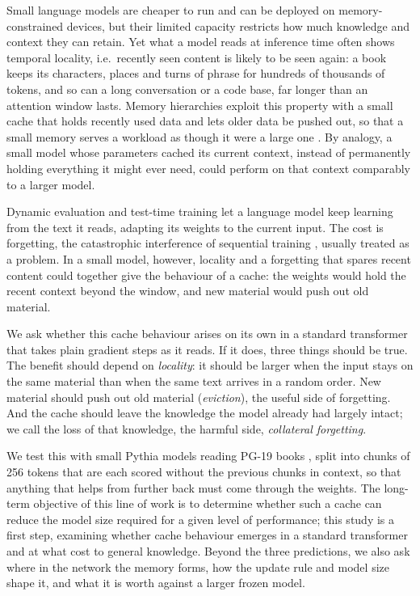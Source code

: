 \documentclass[times,twocolumn,final,authoryear]{elsarticle}
\begin{document}
Small language models are cheaper to run and can be deployed on memory-constrained devices, but their limited capacity restricts how much knowledge and context they can retain.
Yet what a model reads at inference time often shows temporal locality, i.e.\ recently seen content is likely to be seen again: a book keeps its characters, places and turns of phrase for hundreds of thousands of tokens, and so can a long conversation or a code base, far longer than an attention window lasts.
Memory hierarchies exploit this property with a small cache that holds recently used data and lets older data be pushed out, so that a small memory serves a workload as though it were a large one \citep{denning1968working}.
By analogy, a small model whose parameters cached its current context, instead of permanently holding everything it might ever need, could perform on that context comparably to a larger model.

Dynamic evaluation \citep{krause2018dynamic,krause2019dynamic,rannentriki2024revisiting} and test-time training \citep{feng2026inplace,bansal2026lets,tandon2025endtoend} let a language model keep learning from the text it reads, adapting its weights to the current input.
The cost is forgetting, the catastrophic interference of sequential training \citep{mccloskey1989catastrophic}, usually treated as a problem.
In a small model, however, locality and a forgetting that spares recent content could together give the behaviour of a cache: the weights would hold the recent context beyond the window, and new material would push out old material.

We ask whether this cache behaviour arises on its own in a standard transformer that takes plain gradient steps as it reads.
If it does, three things should be true.
The benefit should depend on \emph{locality}: it should be larger when the input stays on the same material than when the same text arrives in a random order.
New material should push out old material (\emph{eviction}), the useful side of forgetting.
And the cache should leave the knowledge the model already had largely intact; we call the loss of that knowledge, the harmful side, \emph{collateral forgetting}.

We test this with small Pythia models \citep{biderman2023pythia} reading PG-19 books \citep{rae2020compressive}, split into chunks of 256 tokens that are each scored without the previous chunks in context, so that anything that helps from further back must come through the weights.
The long-term objective of this line of work is to determine whether such a cache can reduce the model size required for a given level of performance; this study is a first step, examining whether cache behaviour emerges in a standard transformer and at what cost to general knowledge.
Beyond the three predictions, we also ask where in the network the memory forms, how the update rule and model size shape it, and what it is worth against a larger frozen model.
\end{document}
